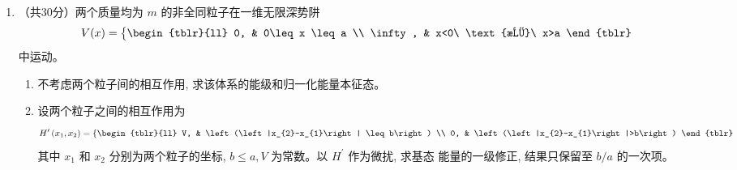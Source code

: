 \begin{enumerate}
{\begin{enumerate}
	\item 
对于归一化列矢 $(a,b)^T$，
\[
 \langle s_y\rangle=\frac\hbar2(a^*,b^*)\begin{pmatrix}0&-i\\i&0\end{pmatrix}
 \begin{pmatrix}a\\b\end{pmatrix}=\hbar\operatorname{Im}(a^*b).
\]
所以两态分别给出 $\boxed{\langle s_y\rangle_{\lambda_1}=12\hbar/25}$ 与
$\boxed{\langle s_y\rangle_{\lambda_2}=-12\hbar/25}$。
两种相对相位均满足题设，不能只保留其中一种。
		
	\end{enumerate}
	
	
}


\newpage
\item 
（共30分）两个质量均为 $m$ 的非全同粒子在一维无限深势阱
$$
V(x)=\left\{\begin{tblr}{ll}
	0, & 0\leq x \leq a \\
	\infty, & x<0\ \text{或}\ x>a
\end{tblr}\right.
$$
中运动。
\begin{enumerate}
	\item
	不考虑两个粒子间的相互作用, 求该体系的能级和归一化能量本征态。 
	\item 
	设两个粒子之间的相互作用为
	$$
	H^{\prime}\left(x_{1}, x_{2}\right)=\left\{\begin{tblr}{ll}
		V, & \left(\left|x_{2}-x_{1}\right| \leq b\right) \\
		0, & \left(\left|x_{2}-x_{1}\right|>b\right)
	\end{tblr}\right.
	$$
	其中 $x_{1}$ 和 $x_{2}$ 分别为两个粒子的坐标, $b \leq a, V$ 为常数。以 $H^{\prime}$ 作为微扰, 求基态 能量的一级修正, 结果只保留至 $b / a$ 的一次项。
	

\end{enumerate}
\end{enumerate}
